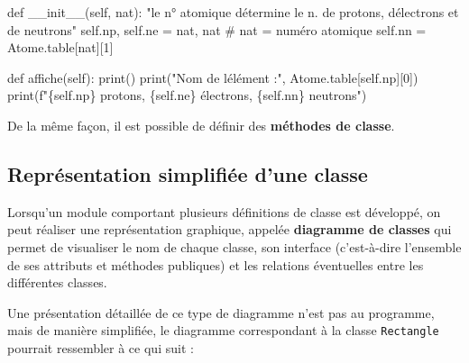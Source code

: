 \documentclass[
  a4paper,
  DIV=11,
  numbers=noendperiod]{scrartcl}
\newenvironment{Shaded}{\begin{snugshade}}{\end{snugshade}}
\newcommand{\BuiltInTok}[1]{\textcolor[rgb]{0.00,0.23,0.31}{#1}}
\newcommand{\CommentTok}[1]{\textcolor[rgb]{0.37,0.37,0.37}{#1}}
\newcommand{\DecValTok}[1]{\textcolor[rgb]{0.68,0.00,0.00}{#1}}
\newcommand{\FunctionTok}[1]{\textcolor[rgb]{0.28,0.35,0.67}{#1}}
\newcommand{\KeywordTok}[1]{\textcolor[rgb]{0.00,0.23,0.31}{#1}}
\newcommand{\NormalTok}[1]{\textcolor[rgb]{0.00,0.23,0.31}{#1}}
\newcommand{\OperatorTok}[1]{\textcolor[rgb]{0.37,0.37,0.37}{#1}}
\newcommand{\SpecialCharTok}[1]{\textcolor[rgb]{0.37,0.37,0.37}{#1}}
\newcommand{\SpecialStringTok}[1]{\textcolor[rgb]{0.13,0.47,0.30}{#1}}
\newcommand{\StringTok}[1]{\textcolor[rgb]{0.13,0.47,0.30}{#1}}
\newcommand{\VariableTok}[1]{\textcolor[rgb]{0.07,0.07,0.07}{#1}}
\begin{document}
\begin{tcolorbox}
\begin{Shaded}
\begin{Highlighting}[]
\KeywordTok{def} \FunctionTok{\_\_init\_\_}\NormalTok{(}\VariableTok{self}\NormalTok{, nat):}
    \CommentTok{"le n° atomique détermine le n. de protons, d\textquotesingle{}électrons et de neutrons"}
    \VariableTok{self}\NormalTok{.np, }\VariableTok{self}\NormalTok{.ne }\OperatorTok{=}\NormalTok{ nat, nat  }\CommentTok{\# nat = numéro atomique}
    \VariableTok{self}\NormalTok{.nn }\OperatorTok{=}\NormalTok{ Atome.table[nat][}\DecValTok{1}\NormalTok{]}

\KeywordTok{def}\NormalTok{ affiche(}\VariableTok{self}\NormalTok{):}
    \BuiltInTok{print}\NormalTok{()}
    \BuiltInTok{print}\NormalTok{(}\StringTok{"Nom de l\textquotesingle{}élément :"}\NormalTok{, Atome.table[}\VariableTok{self}\NormalTok{.np][}\DecValTok{0}\NormalTok{])}
    \BuiltInTok{print}\NormalTok{(}\SpecialStringTok{f"}\SpecialCharTok{\{}\VariableTok{self}\SpecialCharTok{.}\NormalTok{np}\SpecialCharTok{\}}\SpecialStringTok{ protons, }\SpecialCharTok{\{}\VariableTok{self}\SpecialCharTok{.}\NormalTok{ne}\SpecialCharTok{\}}\SpecialStringTok{ électrons, }\SpecialCharTok{\{}\VariableTok{self}\SpecialCharTok{.}\NormalTok{nn}\SpecialCharTok{\}}\SpecialStringTok{ neutrons"}\NormalTok{)}
\end{Highlighting}
\end{Shaded}

De la même façon, il est possible de définir des \textbf{méthodes de
classe}.

\end{tcolorbox}

\hypertarget{repruxe9sentation-simplifiuxe9e-dune-classe}{%
\subsection{Représentation simplifiée d'une
classe}\label{repruxe9sentation-simplifiuxe9e-dune-classe}}

Lorsqu'un module comportant plusieurs définitions de classe est
développé, on peut réaliser une représentation graphique, appelée
\textbf{diagramme de classes} qui permet de visualiser le nom de chaque
classe, son interface (c'est-à-dire l'ensemble de ses attributs et
méthodes publiques) et les relations éventuelles entre les différentes
classes.

Une présentation détaillée de ce type de diagramme n'est pas au
programme, mais de manière simplifiée, le diagramme correspondant à la
classe \texttt{Rectangle} pourrait ressembler à ce qui suit :
\end{document}
